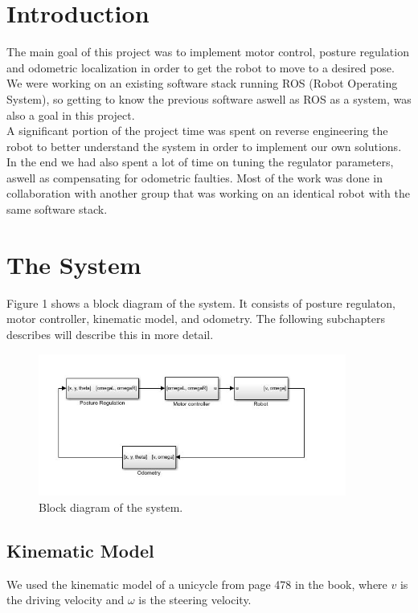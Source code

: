 \documentclass[a4paper,10pt]{article}
\begin{document}
\section{Introduction}
The main goal of this project was to implement motor control, posture regulation and odometric localization in order to get the robot to move to a desired pose. We were working on an existing software stack running ROS (Robot Operating System), so getting to know the previous software aswell as ROS as a system, was also a goal in this project.\\
A significant portion of the project time was spent on reverse engineering the robot to better understand the system in order to implement our own solutions. In the end we had also spent a lot of time on tuning the regulator parameters, aswell as compensating for odometric faulties. Most of the work was done in collaboration with another group that was working on an identical robot with the same software stack. \\

\section{The System}
Figure 1 shows a block diagram of the system. It consists of posture regulaton, motor controller, kinematic model, and odometry. The following subchapters describes will describe this in more detail.

	\begin{figure}[H]
	\centering
	\includegraphics[width=0.9\textwidth]{blokkskjema}
	\caption{Block diagram of the system.}	
 	\label{fig:2}
	\end{figure}

\subsection{Kinematic Model}
We used the kinematic model of a unicycle from page 478 in the book, where $v$ is the driving velocity and $\omega$ is the steering velocity.
\end{document}
